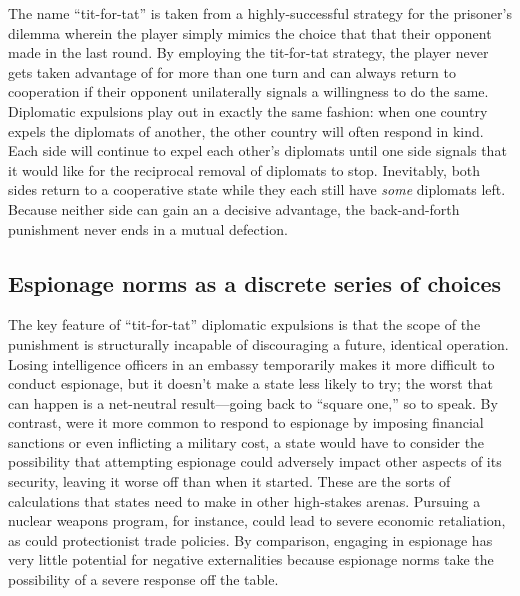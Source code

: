 \documentclass[14pt]{extarticle}
\begin{document}
The name \enquote{tit-for-tat} is taken from a highly-successful strategy for the prisoner's dilemma wherein the player simply mimics the choice that that their opponent made in the last round. By employing the tit-for-tat strategy, the player never gets taken advantage of for more than one turn and can always return to cooperation if their opponent unilaterally signals a willingness to do the same. Diplomatic expulsions play out in exactly the same fashion: when one country expels the diplomats of another, the other country will often respond in kind. Each side will continue to expel each other's diplomats until one side signals that it would like for the reciprocal removal of diplomats to stop. Inevitably, both sides return to a cooperative state while they each still have \emph{some} diplomats left. Because neither side can gain an a decisive advantage, the back-and-forth punishment never ends in a mutual defection.

\subsection{Espionage norms as a discrete series of choices}
The key feature of \enquote{tit-for-tat} diplomatic expulsions is that the scope of the punishment is structurally incapable of discouraging a future, identical operation. Losing intelligence officers in an embassy temporarily makes it more difficult to conduct espionage, but it doesn't make a state less likely to try; the worst that can happen is a net-neutral result---going back to \enquote{square one,} so to speak. By contrast, were it more common to respond to espionage by imposing financial sanctions or even inflicting a military cost, a state would have to consider the possibility that attempting espionage could adversely impact other aspects of its security, leaving it worse off than when it started. These are the sorts of calculations that states need to make in other high-stakes arenas. Pursuing a nuclear weapons program, for instance, could lead to severe economic retaliation, as could protectionist trade policies. By comparison, engaging in espionage has very little potential for negative externalities because espionage norms take the possibility of a severe response off the table.
\end{document}
